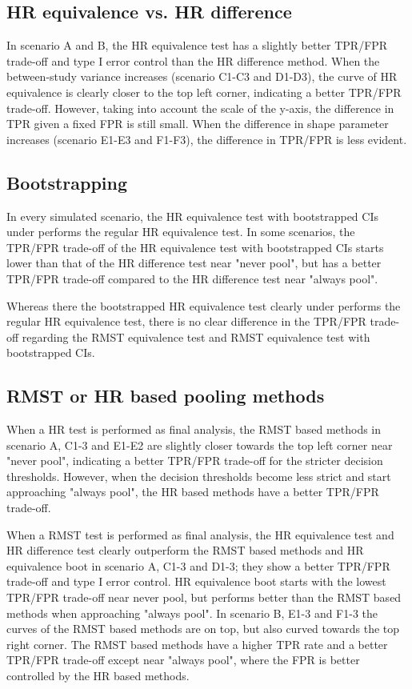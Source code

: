 \documentclass[Royal,sagev,times]{sagej}
\begin{document}
\subsection{HR equivalence vs. HR difference}
In scenario A and B, the HR equivalence test has a slightly better TPR/FPR trade-off and type I error control than the HR difference method. When the between-study variance increases (scenario C1-C3 and D1-D3), the curve of HR equivalence is clearly closer to the top left corner, indicating a better TPR/FPR trade-off. However, taking into account the scale of the y-axis, the difference in TPR given a fixed FPR is still small. When the difference in shape parameter increases (scenario E1-E3 and F1-F3), the difference in TPR/FPR is less evident. 

\subsection{Bootstrapping}
In every simulated scenario, the HR equivalence test with bootstrapped CIs under performs the regular HR equivalence test. In some scenarios, the TPR/FPR trade-off of the HR equivalence test with bootstrapped CIs starts lower than that of the HR difference test near "never pool", but has a better TPR/FPR trade-off compared to the HR difference test near "always pool".     

Whereas there the bootstrapped HR equivalence test clearly under performs the regular HR equivalence test, there is no clear difference in the TPR/FPR trade-off regarding the RMST equivalence test and RMST equivalence test with bootstrapped CIs.

\subsection{RMST or HR based pooling methods}
When a HR test is performed as final analysis, the RMST based methods in scenario A, C1-3 and E1-E2 are slightly closer towards the top left corner near "never pool", indicating a better TPR/FPR trade-off for the stricter decision thresholds. However, when the decision thresholds become less strict and start approaching "always pool", the HR based methods have a better TPR/FPR trade-off. 

When a RMST test is performed as final analysis, the HR equivalence test and HR difference test clearly outperform the RMST based methods and HR equivalence boot in scenario A, C1-3 and D1-3; they show a better TPR/FPR trade-off and type I error control. HR equivalence boot starts with the lowest TPR/FPR trade-off near never pool, but performs better than the RMST based methods when approaching "always pool". In scenario B, E1-3 and F1-3 the curves of the RMST based methods are on top, but also curved towards the top right corner. The RMST based methods have a higher TPR rate and a better TPR/FPR trade-off except near "always pool", where the FPR is better controlled by the HR based methods.
\end{document}
